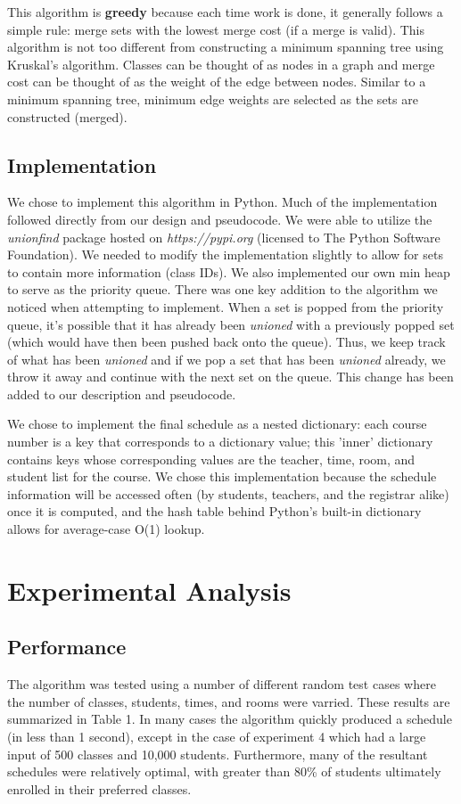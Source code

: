 \documentclass[11pt, oneside]{article}   	%
\begin{document}
This algorithm is {\bf greedy} because each time work is done, it generally follows a simple rule: merge sets with the lowest merge cost (if a merge is valid). This algorithm is not too different from constructing a minimum spanning tree using Kruskal's algorithm. Classes can be thought of as nodes in a graph and merge cost can be thought of as the weight of the edge between nodes. Similar to a minimum spanning tree, minimum edge weights are selected as the sets are constructed (merged). 

\subsection{Implementation}
We chose to implement this algorithm in Python. Much of the implementation followed directly from our design and pseudocode. We were able to utilize the {\it unionfind} package hosted on {\it https://pypi.org} (licensed to The Python Software Foundation). We needed to modify the implementation slightly to allow for sets to contain more information (class IDs). We also implemented our own min heap to serve as the priority queue. There was one key addition to the algorithm we noticed when attempting to implement. When a set is popped from the priority queue, it's possible that it has already been {\it unioned} with a previously popped set (which would have then been pushed back onto the queue). Thus, we keep track of what has been {\it unioned} and if we pop a set that has been {\it unioned} already, we throw it away and continue with the next set on the queue. This change has been added to our description and pseudocode.

We chose to implement the final schedule as a nested dictionary: each course number is a key that corresponds to a dictionary value; this 'inner' dictionary contains keys whose corresponding values are the teacher, time, room, and student list for the course. We chose this implementation because the schedule information will be accessed often (by students, teachers, and the registrar alike) once it is computed, and the hash table behind Python's built-in dictionary allows for average-case O(1) lookup. \\

\section{Experimental Analysis}
\subsection{Performance}
The algorithm was tested using a number of different random test cases where the number of classes, students, times, and rooms were varried. These results are summarized in Table 1. In many cases the algorithm quickly produced a schedule (in less than 1 second), except in the case of experiment 4 which had a large input of 500 classes and 10,000 students. Furthermore, many of the resultant schedules were relatively optimal, with greater than 80\% of students ultimately enrolled in their preferred classes. 
\end{document}

